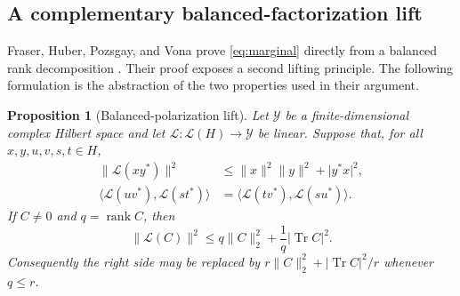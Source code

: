\documentclass[11pt,reqno]{amsart}
\newtheorem{proposition}[theorem]{Proposition}
\theoremstyle{remark}
\DeclareMathOperator{\Tr}{Tr}
\DeclareMathOperator{\rank}{rank}
\newcommand{\cL}{\mathcal L}
\newcommand{\ip}[2]{\langle #1,#2\rangle}
\newcommand{\norm}[1]{\lVert #1\rVert}
\newcommand{\abs}[1]{\lvert #1\rvert}
\begin{document}
\subsection{A complementary balanced-factorization lift}
\label{sec:balanced-route}

Fraser, Huber, Pozsgay, and Vona prove \cref{eq:marginal} directly from a
balanced rank decomposition \cite[Lem.~7.1 and \S8]{FraserHuberPozsgayVona2026}.
Their proof exposes a second lifting principle.  The following formulation is
the abstraction of the two properties used in their argument.

\begin{proposition}[Balanced-polarization lift]
\label{prop:balanced-lift}
Let $\mathcal Y$ be a finite-dimensional complex Hilbert space and let
$\mathcal L:\cL(H)\to\mathcal Y$ be linear.  Suppose that, for all
$x,y,u,v,s,t\in H$,
\begin{align}
\label{eq:balanced-rank-one}
  \norm{\mathcal L(xy^*)}^2
  &\le \norm x^2\norm y^2+\abs{y^*x}^2,\\
\label{eq:crossed-polarization}
  \ip{\mathcal L(uv^*)}{\mathcal L(st^*)}
  &=\ip{\mathcal L(tv^*)}{\mathcal L(su^*)}.
\end{align}
If $C\ne0$ and $q=\rank C$, then
\begin{equation}
\label{eq:balanced-lift}
  \norm{\mathcal L(C)}^2
  \le q\norm C_2^2+\frac1q\abs{\Tr C}^2.
\end{equation}
Consequently the right side may be replaced by
$r\norm C_2^2+\abs{\Tr C}^2/r$ whenever $q\le r$.
\end{proposition}
\end{document}
